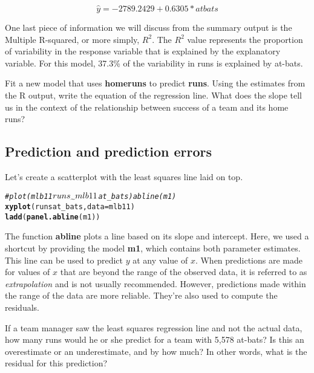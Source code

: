 \documentclass{article}\usepackage[]{graphicx}\usepackage[]{color}
\makeatletter
\newcommand{\hlcom}[1]{\textcolor[rgb]{0.678,0.584,0.686}{\textit{#1}}}%
\newcommand{\hlopt}[1]{\textcolor[rgb]{0,0,0}{#1}}%
\newcommand{\hlstd}[1]{\textcolor[rgb]{0.345,0.345,0.345}{#1}}%
\newcommand{\hlkwc}[1]{\textcolor[rgb]{0.333,0.667,0.333}{#1}}%
\newcommand{\hlkwd}[1]{\textcolor[rgb]{0.737,0.353,0.396}{\textbf{#1}}}%
\newenvironment{kframe}{%
 \def\at@end@of@kframe{}%
 \ifinner\ifhmode%
  \def\at@end@of@kframe{\end{minipage}}%
  \begin{minipage}{\columnwidth}%
 \fi\fi%
 \def\FrameCommand##1{\hskip\@totalleftmargin \hskip-\fboxsep
 \colorbox{shadecolor}{##1}\hskip-\fboxsep
     \hskip-\linewidth \hskip-\@totalleftmargin \hskip\columnwidth}%
 \MakeFramed {\advance\hsize-\width
   \@totalleftmargin\z@ \linewidth\hsize
   \@setminipage}}%
 {\par\unskip\endMakeFramed%
 \at@end@of@kframe}
\newenvironment{knitrout}{}{} %
\makeatother
\begin{document}
\[ \hat{y} = -2789.2429 + 0.6305 * atbats \]

One last piece of information we will discuss from the summary output is the Multiple R-squared, or more simply, $R^2$. The $R^2$ value represents the proportion of variability in the response variable that is explained by the explanatory variable. For this model, 37.3\% of the variability in runs is explained by at-bats.

\begin{exercise}
Fit a new model that uses \hlkwd{homeruns} to predict \hlkwd{runs}.  Using the estimates from the R output, write the equation of the regression line. What does the slope tell us in the context of the relationship between success of a team and its home runs?
\end{exercise}


\subsection*{Prediction and prediction errors}

Let's create a scatterplot with the least squares line laid on top.

\begin{knitrout}
\color{fgcolor}\begin{kframe}
\begin{alltt}
\hlcom{# plot(mlb11$runs \mytilde mlb11$at_bats) abline(m1)}
\hlkwd{xyplot}\hlstd{(runs} \hlopt{\mytilde} \hlstd{at_bats,} \hlkwc{data} \hlstd{= mlb11)}
\hlkwd{ladd}\hlstd{(}\hlkwd{panel.abline}\hlstd{(m1))}
\end{alltt}
\end{kframe}
\end{knitrout}


The function \hlkwd{abline} plots a line based on its slope and intercept.  Here, we used a shortcut by providing the model \hlkwd{m1}, which contains both parameter estimates. This line can be used to predict $y$ at any value of $x$.  When predictions are made for values of $x$ that are beyond the range of the observed data, it is referred to as \emph{extrapolation} and is not usually recommended.  However, predictions made within the range of the data are more reliable.  They're also used to compute the residuals.

\begin{exercise}
If a team manager saw the least squares regression line and not the actual data, how many runs would he or she predict for a team with 5,578 at-bats? Is this an overestimate or an underestimate, and by how much? In other words, what is the residual for this prediction?
\end{exercise}
\end{document}

